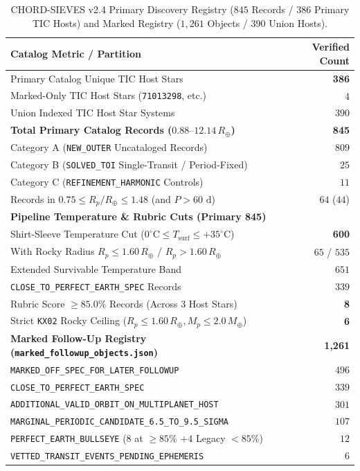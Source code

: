 \documentclass[10pt,twocolumn]{article}
\begin{document}
\begin{table}[t]
\centering
\caption{CHORD-SIEVES v2.4 Primary Discovery Registry ($845$ Records / $386$ Primary TIC Hosts) and Marked Registry ($1{,}261$ Objects / $390$ Union Hosts).}
\label{tab:registry}
\footnotesize
\begin{tabular}{@{}lr@{}}
\toprule
\textbf{Catalog Metric / Partition} & \textbf{Verified Count} \\
\midrule
Primary Catalog Unique TIC Host Stars & \textbf{386} \\
Marked-Only TIC Host Stars (\texttt{71013298}, etc.) & $4$ \\
Union Indexed TIC Host Star Systems & $390$ \\
\textbf{Total Primary Catalog Records ($0.88\text{--}12.14\,R_\oplus$)} & \textbf{845} \\
\quad Category A (\texttt{NEW\_OUTER} Uncataloged Records) & $809$ \\
\quad Category B (\texttt{SOLVED\_TOI} Single-Transit / Period-Fixed) & $25$ \\
\quad Category C (\texttt{REFINEMENT\_HARMONIC} Controls) & $11$ \\
\quad Records in $0.75 \le R_p/R_\oplus \le 1.48$ (and $P > 60\text{ d}$) & $64$ ($44$) \\
\midrule
\textbf{Pipeline Temperature \& Rubric Cuts (Primary 845)} & \\
\quad Shirt-Sleeve Temperature Cut ($0^\circ\text{C} \le T_{\text{surf}} \le +35^\circ\text{C}$) & \textbf{600} \\
\quad \quad With Rocky Radius $R_p \le 1.60\,R_\oplus$ / $R_p > 1.60\,R_\oplus$ & $65$ / $535$ \\
\quad Extended Survivable Temperature Band & $651$ \\
\quad \texttt{CLOSE\_TO\_PERFECT\_EARTH\_SPEC} Records & $339$ \\
\quad Rubric Score $\ge 85.0\%$ Records (Across 3 Host Stars) & \textbf{8} \\
\quad Strict \texttt{KX02} Rocky Ceiling ($R_p \le 1.60\,R_\oplus, M_p \le 2.0\,M_\oplus$) & \textbf{6} \\
\midrule
\textbf{Marked Follow-Up Registry (\texttt{marked\_followup\_objects.json})} & \textbf{1,261} \\
\quad \texttt{MARKED\_OFF\_SPEC\_FOR\_LATER\_FOLLOWUP} & $496$ \\
\quad \texttt{CLOSE\_TO\_PERFECT\_EARTH\_SPEC} & $339$ \\
\quad \texttt{ADDITIONAL\_VALID\_ORBIT\_ON\_MULTIPLANET\_HOST} & $301$ \\
\quad \texttt{MARGINAL\_PERIODIC\_CANDIDATE\_6.5\_TO\_9.5\_SIGMA} & $107$ \\
\quad \texttt{PERFECT\_EARTH\_BULLSEYE} ($8$ at $\ge 85\%$ $+ 4$ Legacy $<85\%$) & $12$ \\
\quad \texttt{VETTED\_TRANSIT\_EVENTS\_PENDING\_EPHEMERIS} & $6$ \\
\bottomrule
\end{tabular}
\end{table}
\end{document}
